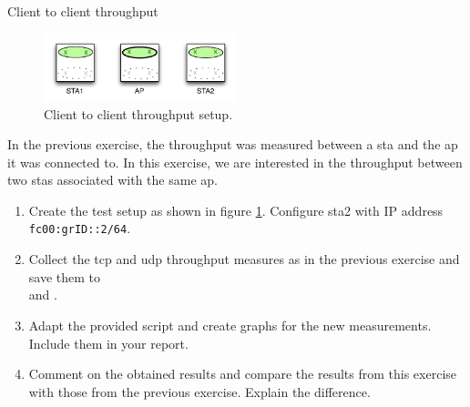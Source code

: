 \begin{exercise}{Client to client throughput}
\label{ex:tput2}
	\begin{figure}[h!]
		\begin{center}

			\includegraphics[width=0.5\textwidth]{images/perf2.pdf}
			\caption{Client to client throughput setup.} 
			\label{fig:perf2} 
		\end{center}
	\end{figure}
	
	In the previous exercise, the throughput was measured between a \ac{sta} and the \ac{ap} it was connected to. In this exercise, we are interested in the throughput between two \acp{sta} associated with the same \ac{ap}.
	\begin{enumerate}
		\item Create the test setup as shown in figure \ref{fig:perf2}. Configure \acs{sta}2 with IP address \texttt{fc00:grID::2/64}.
		\item Collect the \ac{tcp} and \ac{udp} throughput measures as in the previous exercise and save them to \\ and .
		\item Adapt the provided  script and create graphs for the new measurements. Include them in your report.
		\item Comment on the obtained results and compare the results from this exercise with those from the previous exercise. Explain the difference.\newline
		\begin{esolution}
		\end{esolution} 
	\end{enumerate}
	
\end{exercise}

